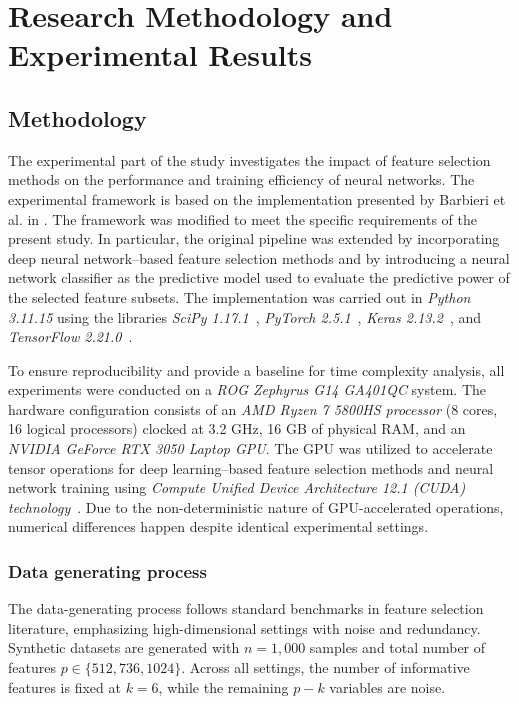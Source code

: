 \chapter{Research Methodology and Experimental Results}
\section{Methodology}

The experimental part of the study investigates the impact of feature selection methods on the performance and training efficiency of neural networks. The experimental framework is based on the implementation presented by Barbieri et al. in \cite{barbieri2022}. The framework was modified to meet the specific requirements of the present study. In particular, the original pipeline was extended by incorporating deep neural network–based feature selection methods and by introducing a neural network classifier as the predictive model used to evaluate the predictive power of the selected feature subsets. The implementation was carried out in \emph{Python 3.11.15} using the libraries \emph{SciPy 1.17.1}~\cite{scipy2020}, \emph{PyTorch 2.5.1}~\cite{pytorch2019}, \emph{Keras 2.13.2}~\cite{keras2015}, and \emph{TensorFlow 2.21.0}~\cite{tensorflow2016}.

To ensure reproducibility and provide a baseline for time complexity analysis, all experiments were conducted on a \emph{ROG Zephyrus G14 GA401QC} system. The hardware configuration consists of an \emph{AMD Ryzen 7 5800HS processor} (8 cores, 16 logical processors) clocked at 3.2 GHz, 16 GB of physical RAM, and an \emph{NVIDIA GeForce RTX 3050 Laptop GPU}. The GPU was utilized to accelerate tensor operations for deep learning–based feature selection methods and neural network training using \emph{Compute Unified Device Architecture 12.1 (CUDA) technology}~\cite{cuda_docs}. Due to the non-deterministic nature of GPU-accelerated operations, numerical differences happen despite identical experimental settings.

\subsection{Data generating process}

The data-generating process follows standard benchmarks in feature selection literature, emphasizing high-dimensional settings with noise and redundancy. Synthetic datasets are generated with $n = 1,000$ samples and total number of features $p \in \{512, 736, 1024\}$. Across all settings, the number of informative features is fixed at $k = 6$, while the remaining $p - k$ variables are noise.

